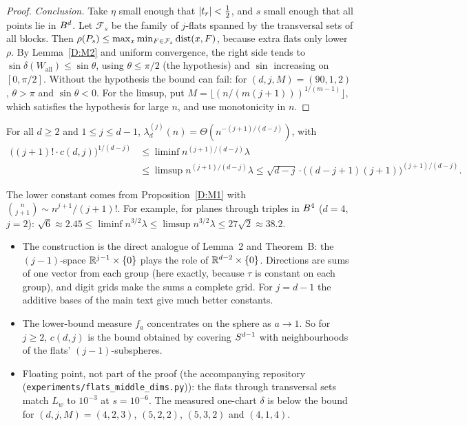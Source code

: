 \begin{proof}
\emph{Conclusion.} Take $\eta$ small enough that $\left|t_r\right|<\frac12$, and $s$ small enough that all
points lie in $B^d$. Let $\mathcal{F}_s$ be the family of $j$-flats spanned by the transversal
sets of all blocks. Then $\rho(P_s)\le\max_x\min_{F\in\mathcal{F}_s}\operatorname{dist}(x,F)$, because extra flats
only lower $\rho$. By Lemma~\ref{D:M2} and uniform convergence, the right side tends to
$\sin\delta(W_{\mathrm{all}})\le\sin\theta$, using $\theta\le\pi/2$ (the hypothesis) and $\sin$
increasing on $[0,\pi/2]$. Without the hypothesis the bound can fail: for $(d,j,M)=(90,1,2)$,
$\theta>\pi$ and $\sin\theta<0$. For the limsup, put
$M=\bigl\lfloor(n/(m(j+1)))^{1/(m-1)}\bigr\rfloor$, which satisfies the hypothesis for large $n$, and
use monotonicity in $n$.
\end{proof}

\begin{corollary}\label{D:M4}
For all $d\ge2$ and $1\le j\le d-1$, $\lambda_d^{(j)}(n)=\Theta(n^{-(j+1)/(d-j)})$, with
\begin{align*}
  \bigl((j+1)!\cdot c(d,j)\bigr)^{1/(d-j)}&\le\liminf n^{(j+1)/(d-j)}\lambda\\
  &\le\limsup n^{(j+1)/(d-j)}\lambda\le\sqrt{d-j}\cdot\bigl((d-j+1)(j+1)\bigr)^{(j+1)/(d-j)}.
\end{align*}
\end{corollary}

The lower constant comes from Proposition~\ref{D:M1} with $\binom{n}{j+1}\sim n^{j+1}/(j+1)!$. For
example, for planes through triples in $B^4$ ($d=4$, $j=2$):
$\sqrt6\approx2.45\le\liminf n^{3/2}\lambda\le\limsup n^{3/2}\lambda\le27\sqrt2\approx38.2$.

\begin{remark}\leavevmode
\begin{itemize}
  \item The construction is the direct analogue of Lemma~2 and Theorem~B: the $(j-1)$-space
    $\mathbb{R}^{j-1}\times\{0\}$ plays the role of $\mathbb{R}^{d-2}\times\{0\}$. Directions are sums of one vector
    from each group (here exactly, because $\tau$ is constant on each group), and digit grids make
    the sums a complete grid. For $j=d-1$ the additive bases of the main text give much better
    constants.
  \item The lower-bound measure $f_a$ concentrates on the sphere as $a\to1$. So for $j\ge2$,
    $c(d,j)$ is the bound obtained by covering $S^{d-1}$ with neighbourhoods of the flats'
    $(j-1)$-subspheres.
  \item Floating point, not part of the proof (the accompanying repository
    (\texttt{experiments/\allowbreak flats\_\allowbreak middle\_\allowbreak dims.py})): the flats through transversal sets match $L_w$
    to $10^{-3}$ at $s=10^{-6}$. The measured one-chart $\delta$ is below the bound for
    $(d,j,M)=(4,2,3)$, $(5,2,2)$, $(5,3,2)$ and $(4,1,4)$.
\end{itemize}
\end{remark}

